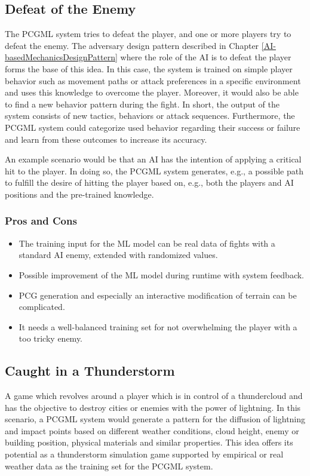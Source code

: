 \documentclass[MGS,Master,english]{twbook}%
\begin{document}
\subsection{Defeat of the Enemy} \label{idea::defeatTheEnemy}
The \ac{PCGML} system tries to defeat the player, and one or more players try to defeat the enemy. The adversary design pattern described in Chapter \ref{AI-basedMechanicsDesignPattern} where the role of the \ac{AI} is to defeat the player forms the base of this idea. In this case, the system is trained on simple player behavior such as movement paths or attack preferences in a specific environment and uses this knowledge to overcome the player. Moreover, it would also be able to find a new behavior pattern during the fight. In short, the output of the system consists of new tactics, behaviors or attack sequences. Furthermore, the \ac{PCGML} system could categorize used behavior regarding their success or failure and learn from these outcomes to increase its accuracy. 

An example scenario would be that an \ac{AI} has the intention of applying a critical hit to the player. In doing so, the \ac{PCGML} system generates, e.g., a possible path to fulfill the desire of hitting the player based on, e.g., both the players and \ac{AI} positions and the pre-trained knowledge.

\subsubsection{Pros and Cons}
\begin{itemize}
	\item The training input for the \ac{ML} model can be real data of fights with a standard \ac{AI} enemy, extended with randomized values.
	\item Possible improvement of the \ac{ML} model during runtime with system feedback.
	\item \ac{PCG} generation and especially an interactive modification of terrain can be complicated.
	\item It needs a well-balanced training set for not overwhelming the player with a too tricky enemy.
\end{itemize}


\subsection{Caught in a Thunderstorm} \label{idea::caughtInAThunderstorm}
A game which revolves around a player which is in control of a thundercloud and has the objective to destroy cities or enemies with the power of lightning. In this scenario, a \ac{PCGML} system would generate a pattern for the diffusion of lightning and impact points based on different weather conditions, cloud height, enemy or building position, physical materials and similar properties. This idea offers its potential as a thunderstorm simulation game supported by empirical or real weather data as the training set for the \ac{PCGML} system.
\end{document}
